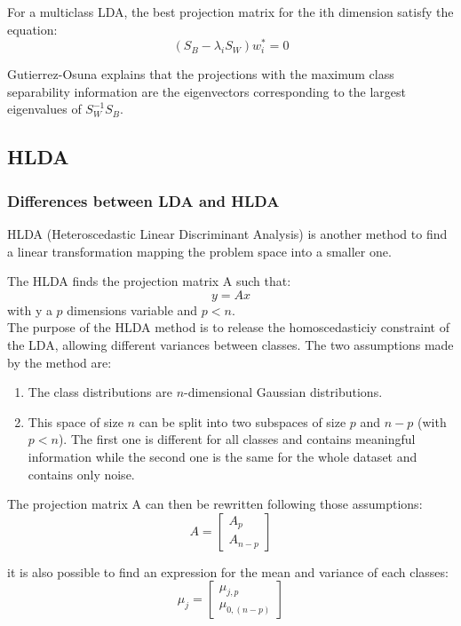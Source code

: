 For a multiclass LDA, the best projection matrix for the ith dimension satisfy the equation:
$$(S_B - \lambda_i S_W)w_{i}^* = 0$$

Gutierrez-Osuna\cite{gutierrez.osuna} explains that the projections with the maximum class separability information are the eigenvectors corresponding to the largest eigenvalues of $S_{W}^{-1} S_B$.

\subsection{HLDA}

\subsubsection{Differences between LDA and HLDA}

HLDA (Heteroscedastic Linear Discriminant Analysis) is another method to find a linear transformation mapping the problem space into a smaller one.

The HLDA finds the projection matrix A such that:
$$y = Ax$$
with y a $p$ dimensions variable and $p < n$.\\

The purpose of the HLDA method is to release the homoscedasticiy constraint of the LDA, allowing different variances between classes. The two assumptions made by the method are:

\begin{enumerate}
  \item The class distributions are $n$-dimensional Gaussian distributions.
  \item This space of size $n$ can be split into two subspaces of size $p$
    and $n - p$ (with $p < n$). The first one is different for all classes and contains meaningful information while the second one is the same for the whole dataset and contains only noise.
\end{enumerate}

The projection matrix A can then be rewritten following those assumptions:
$$A = \left [
  \begin{array}{c}
    A_p\\
    A_{n-p}
  \end{array}
\right ]
$$

it is also possible to find an expression for the mean and variance of each classes:
$$\mu_j =
\left [
  \begin{array}{c}
    \mu_{j,p}\\
    \mu_{0,(n-p)}
  \end{array}
\right ]
$$

